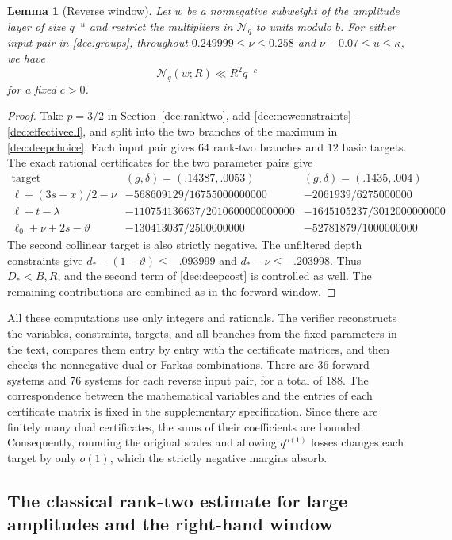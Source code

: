 \documentclass[11pt,a4paper]{article}
\theoremstyle{paperplain}
\newtheorem{lemma}[theorem]{Lemma}
\numberwithin{equation}{section}
\begin{document}
\begin{lemma}[Reverse window]\label{dec:reverselemma}
Let $w$ be a nonnegative subweight of the amplitude layer of size
$q^{-u}$ and restrict the multipliers in $\mathcal N_q$ to units
modulo $b$. For either input pair in \eqref{dec:groups}, throughout
$0.249999\le\nu\le0.258$ and $\nu-0.07\le u\le\kappa$, we have
\[
 \mathcal N_q(w;R)\ll R^2q^{-c}
\]
for a fixed $c>0$.
\end{lemma}
\begin{proof}
Take $p=3/2$ in Section~\ref{dec:ranktwo}, add
\eqref{dec:newconstraints}--\eqref{dec:effectiveell}, and split into
the two branches of the maximum in \eqref{dec:deepchoice}.
Each input pair gives $64$ rank-two branches and $12$ basic targets.
The exact rational certificates for the two parameter pairs give
\[
\begin{array}{c|c|c}
 \text{target}&(g,\delta)=(.14387,.0053)&(g,\delta)=(.1435,.004)\\ \hline
 \ell+(3s-x)/2-\nu&-568609129/16755000000000&-2061939/6275000000\\
 \ell+t-\lambda&-110754136637/2010600000000000&-1645105237/3012000000000\\
 \ell_0+\nu+2s-\vartheta&-130413037/2500000000&-52781879/1000000000
\end{array}
\]
The second collinear target is also strictly negative.
The unfiltered depth constraints give
$d_*-(1-\vartheta)\le-.093999$ and $d_*-\nu\le-.203998$.
Thus $D_*<B,R$, and the second term of \eqref{dec:deepcost}
is controlled as well. The remaining contributions are combined
as in the forward window.
\end{proof}

All these computations use only integers and rationals.
The verifier reconstructs the variables, constraints, targets, and all
branches from the fixed parameters in the text, compares them entry by
entry with the certificate matrices, and then checks the nonnegative
dual or Farkas combinations. There are $36$ forward systems and $76$
systems for each reverse input pair, for a total of $188$.
The correspondence between the mathematical variables and the entries
of each certificate matrix is fixed in the supplementary specification.
Since there are finitely many dual certificates, the sums of their
coefficients are bounded.
Consequently, rounding the original scales and allowing $q^{o(1)}$
losses changes each target by only $o(1)$, which the strictly negative
margins absorb.

\subsection{The classical rank-two estimate for large amplitudes and the right-hand window}
\label{dec:oldranktwo}
\end{document}
